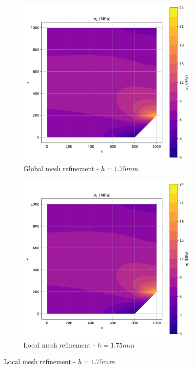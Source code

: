\begin{figure}[H]
  \centering
  \begin{subfigure}[b]{0.45\textwidth}
    \centering
    \includegraphics[width=\textwidth]{GRAFICOS/Quad4/1.75mm_global/resultados - sigma_1.png}
    \caption{Global mesh refinement - $h=1.75mm$}
    \label{fig:img11}
  \end{subfigure}
  \hfill
  \begin{subfigure}[b]{0.45\textwidth}
    \centering
    \includegraphics[width=\textwidth]{GRAFICOS/Quad4/1.75mm_global/resultados - sigma_1.png}
    \caption{Local mesh refinement - $h=1.75mm$}
    \label{fig:img21}
  \end{subfigure}
\end{figure}

